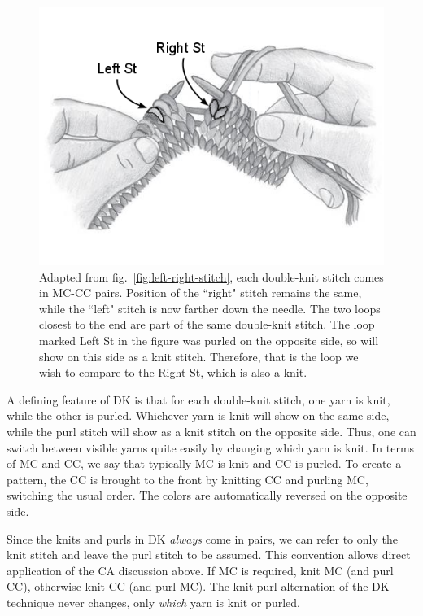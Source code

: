 \documentclass{../knittingpattern}
\begin{document}
\begin{figure}[h]
\label{fig:double-knitting}
\begin{center}
\includegraphics[scale=0.4]{doubleknit.png}
\end{center}

\caption{Adapted from fig.~\ref{fig:left-right-stitch}, each double-knit stitch comes in MC-CC pairs. Position of the ``right" stitch remains the same, while the ``left" stitch is now farther down the needle. The two loops closest to the end are part of the same double-knit stitch. The loop marked Left St in the figure was purled on the opposite side, so will show on this side as a knit stitch. Therefore, that is the loop we wish to compare to the Right St, which is also a knit.}
\end{figure}


A defining feature of DK is that for each double-knit stitch, one yarn is knit, while the other is purled. Whichever yarn is knit will show on the same side, while the purl stitch will show as a knit stitch on the opposite side. Thus, one can switch between visible yarns quite easily by changing which yarn is knit. In terms of MC and CC, we say that typically MC is knit and CC is purled. To create a pattern, the CC is brought to the front by knitting CC and purling MC, switching the usual order. The colors are automatically reversed on the opposite side.

Since the knits and purls in DK \emph{always} come in pairs, we can refer to only the knit stitch and leave the purl stitch to be assumed. This convention allows direct application of the CA discussion above. If MC is required, knit MC (and purl CC), otherwise knit CC (and purl MC). The knit-purl alternation of the DK technique never changes, only \emph{which} yarn is knit or purled.
\end{document}
